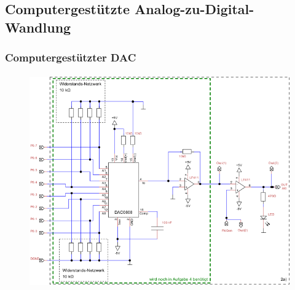 \subsection{Computergestützte Analog-zu-Digital-Wandlung} %
\label{sub:Computergestützte_Analog-zu-Digital-Wandlung}

\begin{frame}
    \frametitle{Computergestützter DAC}
    \framesubtitle{}
     \begin{figure}[H]
     \begin{center}
             \includegraphics[scale=0.4]{./img/schaltung/comp_dac_0.png}
     \end{center}
     \end{figure}
\end{frame}

